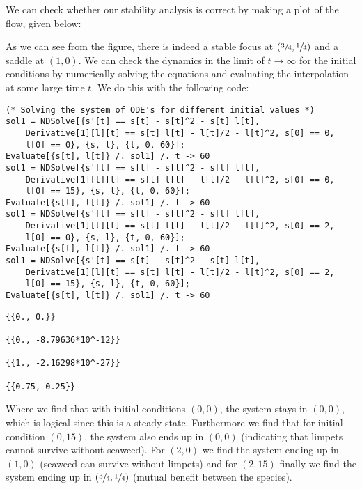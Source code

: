 \documentclass[11pt,a4paper,onecolumn]{article}
\begin{document}
We can check whether our stability analysis is correct by making a plot of the flow, given below:

\begin{figure}[H]
  \centering
\end{figure}

As we can see from the figure, there is indeed a stable focus at $(\sfrac{3}{4},\sfrac{1}{4})$ and a saddle at $(1,0)$. We can check the dynamics in the limit of $t \rightarrow \infty$ for the initial conditions by numerically solving the equations and evaluating the interpolation at some large time $t$. We do this with the following code:

\begin{lstlisting}[mathescape]
(* Solving the system of ODE's for different initial values *)
sol1 = NDSolve[{s'[t] == s[t] - s[t]^2 - s[t] l[t], 
    Derivative[1][l][t] == s[t] l[t] - l[t]/2 - l[t]^2, s[0] == 0, 
    l[0] == 0}, {s, l}, {t, 0, 60}];
Evaluate[{s[t], l[t]} /. sol1] /. t -> 60
sol1 = NDSolve[{s'[t] == s[t] - s[t]^2 - s[t] l[t], 
    Derivative[1][l][t] == s[t] l[t] - l[t]/2 - l[t]^2, s[0] == 0, 
    l[0] == 15}, {s, l}, {t, 0, 60}];
Evaluate[{s[t], l[t]} /. sol1] /. t -> 60
sol1 = NDSolve[{s'[t] == s[t] - s[t]^2 - s[t] l[t], 
    Derivative[1][l][t] == s[t] l[t] - l[t]/2 - l[t]^2, s[0] == 2, 
    l[0] == 0}, {s, l}, {t, 0, 60}];
Evaluate[{s[t], l[t]} /. sol1] /. t -> 60
sol1 = NDSolve[{s'[t] == s[t] - s[t]^2 - s[t] l[t], 
    Derivative[1][l][t] == s[t] l[t] - l[t]/2 - l[t]^2, s[0] == 2, 
    l[0] == 15}, {s, l}, {t, 0, 60}];
Evaluate[{s[t], l[t]} /. sol1] /. t -> 60
\end{lstlisting}

\begin{lstlisting}[mathescape]
{{0., 0.}}

{{0., -8.79636*10^-12}}

{{1., -2.16298*10^-27}}

{{0.75, 0.25}}
\end{lstlisting}

Where we find that with initial conditions $(0,0)$, the system stays in $(0,0)$, which is logical since this is a steady state. Furthermore we find that for initial condition $(0,15)$, the system also ends up in $(0,0)$ (indicating that limpets cannot survive without seaweed). For $(2,0)$ we find the system ending up in $(1,0)$ (seaweed can survive without limpets) and for $(2,15)$ finally we find the system ending up in $(\sfrac{3}{4},\sfrac{1}{4})$ (mutual benefit between the species).
\end{document}

